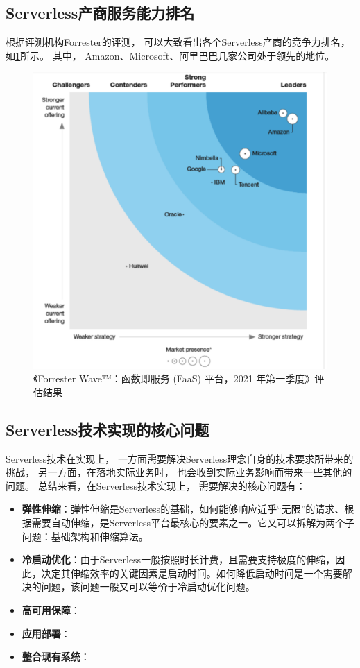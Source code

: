 \subsection{Serverless产商服务能力排名}
根据评测机构Forrester的评测，
可以大致看出各个Serverless产商的竞争力排名，
如\cref{faas_2021_q1_ranking}所示。
其中，
Amazon、Microsoft、阿里巴巴几家公司处于领先的地位。

\begin{figure}[ht!]
    \centering
    \includegraphics[width=0.7\linewidth]{images/faas-2021-q1.png}
    \caption{《Forrester Wave™：函数即服务 (FaaS) 平台，2021 年第一季度》评估结果\cite{serverless_report_2021}}
    \label{faas_2021_q1_ranking}
\end{figure}

\subsection{Serverless技术实现的核心问题}

Serverless技术在实现上，
一方面需要解决Serverless理念自身的技术要求所带来的挑战，
另一方面，在落地实际业务时，
也会收到实际业务影响而带来一些其他的问题。
总结来看，在Serverless技术实现上，
需要解决的核心问题有：

\begin{itemize}
    \item \textbf{弹性伸缩}：弹性伸缩是Serverless的基础，如何能够响应近乎“无限”的请求、根据需要自动伸缩，是Serverless平台最核心的要素之一。它又可以拆解为两个子问题：基础架构和伸缩算法。
    \item \textbf{冷启动优化}：由于Serverless一般按照时长计费，且需要支持极度的伸缩，因此，决定其伸缩效率的关键因素是启动时间。如何降低启动时间是一个需要解决的问题，该问题一般又可以等价于冷启动优化问题。
    \item \textbf{高可用保障}：
    \item \textbf{应用部署}：
    \item \textbf{整合现有系统}：
\end{itemize}